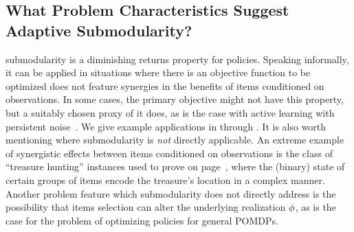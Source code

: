 \subsection{What Problem Characteristics Suggest Adaptive
  Submodularity?}
\Term submodularity is a diminishing returns property for policies.
Speaking informally, it can be applied in situations where there is an objective function
to be optimized does not feature synergies in the benefits of items
conditioned on observations.   In some cases, the primary objective
might not have this property, but a suitably chosen proxy of it does, as is
the case with active learning with persistent noise~\citep{golovin10nips,bellala10modified}.
We give example applications in 
through .   It is also worth mentioning
where \term submodularity is \emph{not} directly applicable.
An extreme example of synergistic effects between items conditioned on
observations is the class of ``treasure hunting'' instances used to prove 
on page~\pageref{thm:hardness}, where the (binary) state of certain
groups of items encode the treasure's location in a complex manner.  Another 
problem feature which \term submodularity does not directly address is
the possibility that items selection can alter the underlying realization ${\color{black}{\ensuremath{\phi}}}$, as
is the case for the problem of optimizing policies for general POMDPs.

%
%
%
%
%
